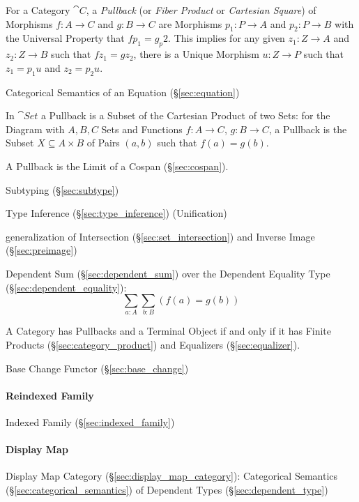 For a Category $\cat{C}$, a \emph{Pullback} (or \emph{Fiber
  Product} or \emph{Cartesian Square}) of Morphisms $f : A \rightarrow
C$ and $g : B \rightarrow C$ are Morphisms $p_1 : P \rightarrow A$ and
$p_2 : P \rightarrow B$ with the Universal Property that $fp_1 =
g_p2$. This implies for any given $z_1 : Z \rightarrow A$ and $z_2 : Z
\rightarrow B$ such that $fz_1 = gz_2$, there is a Unique Morphism $u
: Z \rightarrow P$ such that $z_1 = p_1 u$ and $z_2 = p_2 u$.

Categorical Semantics of an Equation (\S\ref{sec:equation})

In $\cat{Set}$ a Pullback is a Subset of the Cartesian Product of two
Sets: for the Diagram with $A,B,C$ Sets and Functions $f : A
\rightarrow C$, $g : B \rightarrow C$, a Pullback is the Subset $X
\subseteq A \times B$ of Pairs $(a,b)$ such that $f(a) = g(b)$.

A Pullback is the Limit of a Cospan (\S\ref{sec:cospan}).

Subtyping (\S\ref{sec:subtype})

Type Inference (\S\ref{sec:type_inference}) (Unification)

generalization of Intersection (\S\ref{sec:set_intersection}) and
Inverse Image (\S\ref{sec:preimage})

Dependent Sum (\S\ref{sec:dependent_sum}) over the Dependent Equality
Type (\S\ref{sec:dependent_equality}):
\[
  \sum_{a:A} \sum_{b:B} (f(a) = g(b))
\]

A Category has Pullbacks and a Terminal Object if and only if it has
Finite Products (\S\ref{sec:category_product}) and Equalizers
(\S\ref{sec:equalizer}). \cite{awodey06}

Base Change Functor (\S\ref{sec:base_change})



\paragraph{Reindexed Family}\label{sec:reindexed_family}\hfill

Indexed Family (\S\ref{sec:indexed_family})



\paragraph{Display Map}\label{sec:display_map}\hfill

Display Map Category (\S\ref{sec:display_map_category}): Categorical
Semantics (\S\ref{sec:categorical_semantics}) of Dependent Types
(\S\ref{sec:dependent_type})

